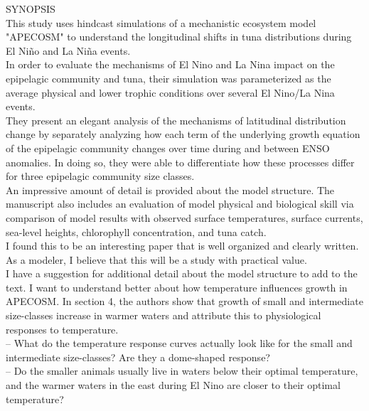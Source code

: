 \documentclass[12pt]{article}
\begin{document}
SYNOPSIS \\

This study uses hindcast simulations of a mechanistic ecosystem model "APECOSM" to understand the longitudinal shifts in tuna distributions during El Niño and La Niña events.\\

In order to evaluate the mechanisms of El Nino and La Nina impact on the epipelagic community and tuna, their simulation was parameterized as the average physical and lower trophic conditions over several El Nino/La Nina events.\\

They present an elegant analysis of the mechanisms of latitudinal distribution change by separately analyzing how each term of the underlying growth equation of the epipelagic community changes over time during and between ENSO anomalies. In doing so, they were able to differentiate how these processes differ for three epipelagic community size classes.\\

An impressive amount of detail is provided about the model structure. The manuscript also includes an evaluation of model physical and biological skill via comparison of model results with observed surface temperatures, surface currents, sea-level heights, chlorophyll concentration, and tuna catch.\\

I found this to be an interesting paper that is well organized and clearly written. As a modeler, I believe that this will be a study with practical value.\\

I have a suggestion for additional detail about the model structure to add to the text. I want to understand better about how temperature influences growth in APECOSM. In section 4, the authors show that growth of small and intermediate size-classes increase in warmer waters and attribute this to physiological responses to temperature.\\

-- What do the temperature response curves actually look like for the small and intermediate size-classes? Are they a dome-shaped response?\\


-- Do the smaller animals usually live in waters below their optimal temperature, and the warmer waters in the east during El Nino are closer to their optimal temperature?\\
\end{document}
